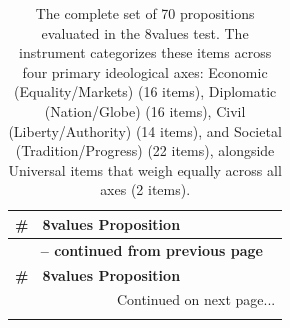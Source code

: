 \documentclass[11pt]{article}
\begin{document}
\scriptsize
\renewcommand{\arraystretch}{1.055} %

\begin{longtable}{r p{0.9\linewidth}}
\caption{The complete set of 70 propositions evaluated in the 8values test. The instrument categorizes these items across four primary ideological axes: \colorbox{evEcon}{Economic (Equality/Markets)} (16 items), \colorbox{evDipl}{Diplomatic (Nation/Globe)} (16 items), \colorbox{evCivil}{Civil (Liberty/Authority)} (14 items), and \colorbox{evScty}{Societal (Tradition/Progress)} (22 items), alongside \colorbox{evUniv}{Universal} items that weigh equally across all axes (2 items).}
\label{tab:8values_propositions} \\
\toprule
\textbf{\#} & \textbf{8values Proposition} \\
\midrule
\endfirsthead

\multicolumn{2}{c}{{\bfseries \tablename\ \thetable{} -- continued from previous page}} \\
\toprule
\textbf{\#} & \textbf{8values Proposition} \\
\midrule
\endhead

\midrule
\multicolumn{2}{r}{{Continued on next page...}} \\
\endfoot

\bottomrule
\endlastfoot


\end{longtable}
\end{document}
